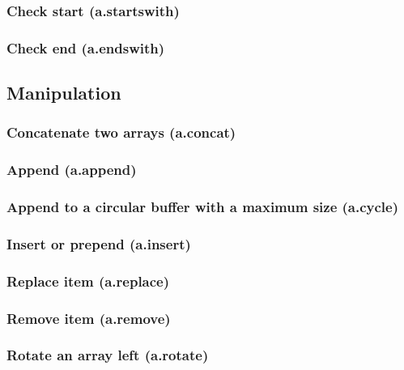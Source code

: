 \documentclass{article}
\theoremstyle{definition}
\begin{document}
\subsubsection{Check start (a.startswith)}

\subsubsection{Check end (a.endswith)}

\subsection{Manipulation}

\subsubsection{Concatenate two arrays (a.concat)}

\subsubsection{Append (a.append)}

\subsubsection{Append to a circular buffer with a maximum size (a.cycle)}

\subsubsection{Insert or prepend (a.insert)}

\subsubsection{Replace item (a.replace)}

\subsubsection{Remove item (a.remove)}

\subsubsection{Rotate an array left (a.rotate)}
\end{document}
